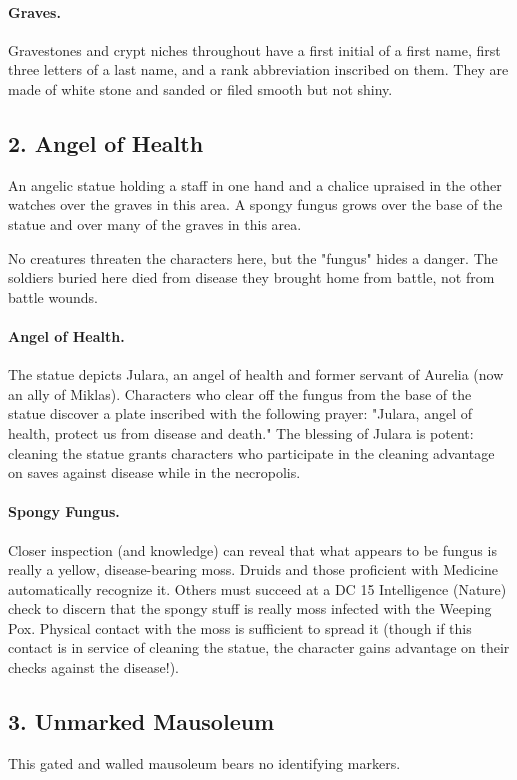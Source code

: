 \documentclass[10pt,a4paper,twoside,twocolumn,openany,bg=print,nodeprecatedcode]{dndbook}
\begin{document}
\paragraph{Graves.}
Gravestones and crypt niches throughout have a first initial of a first name, first three letters of a last name, and a rank abbreviation inscribed on them. They are made of white stone and sanded or filed smooth but not shiny.
\subsection{2. Angel of Health}
\begin{DndReadAloud}{}
An angelic statue holding a staff in one hand and a chalice upraised in the other watches over the graves in this area. A spongy fungus grows over the base of the statue and over many of the graves in this area.
\end{DndReadAloud}

No creatures threaten the characters here, but the "fungus" hides a danger. The soldiers buried here died from disease they brought home from battle, not from battle wounds.
\paragraph{Angel of Health.}
The statue depicts Julara, an angel of health and former servant of Aurelia (now an ally of Miklas). Characters who clear off the fungus from the base of the statue discover a plate inscribed with the following prayer: "Julara, angel of health, protect us from disease and death." The blessing of Julara is potent: cleaning the statue grants characters who participate in the cleaning advantage on saves against disease while in the necropolis.
\paragraph{Spongy Fungus.}
Closer inspection (and knowledge) can reveal that what appears to be fungus is really a yellow, disease-bearing moss. Druids and those proficient with Medicine automatically recognize it. Others must succeed at a DC 15 Intelligence (Nature) check to discern that the spongy stuff is really moss infected with the Weeping Pox. Physical contact with the moss is sufficient to spread it (though if this contact is in service of cleaning the statue, the character gains advantage on their checks against the disease!).
\subsection{3. Unmarked Mausoleum}
\begin{DndReadAloud}{}
This gated and walled mausoleum bears no identifying markers.
\end{DndReadAloud}
\end{document}

